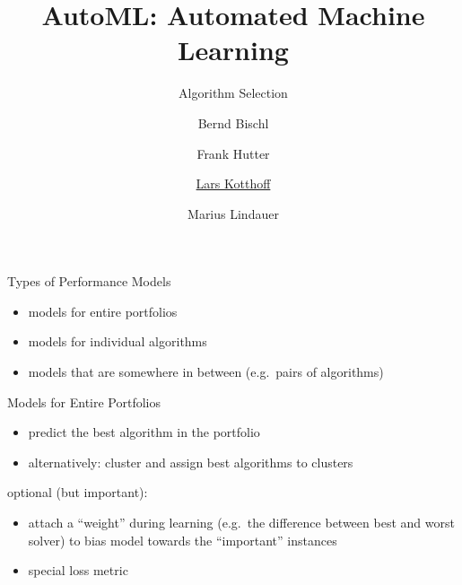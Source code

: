 




\title[AutoML: Overview]{AutoML: Automated Machine Learning}
\subtitle{Algorithm Selection}
\author[Lars Kotthoff]{Bernd Bischl \and Frank Hutter \and \underline{Lars Kotthoff} \and Marius Lindauer}
\institute{}
\date{}





	
	\maketitle
	

\begin{frame}{Types of Performance Models}
\begin{itemize}
\item models for entire portfolios
\item models for individual algorithms
\item models that are somewhere in between (e.g.\ pairs of algorithms)
\end{itemize}
\end{frame}

\begin{frame}{Models for Entire Portfolios}
\begin{itemize}
\item predict the best algorithm in the portfolio
\item alternatively: cluster and assign best algorithms to clusters
\end{itemize}
optional (but important):
\begin{itemize}
\item attach a ``weight'' during learning (e.g.\ the difference between best
    and worst solver) to bias model towards the ``important'' instances
\item special loss metric
\end{itemize}
\end{frame}

